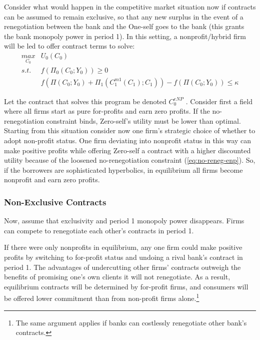 \documentclass[11pt,english]{article}
\theoremstyle{plain}
\theoremstyle{definition}
\begin{document}
Consider what would happen in the competitive market situation now
if contracts can be assumed to remain exclusive, so that any new surplus
in the event of a renegotiation between the bank and the One-self
goes to the bank (this grants the bank monopoly power in period 1).
In this setting, a nonprofit/hybrid firm will be led to offer contract
terms to solve:
\begin{align}
\underset{C_{0}}{max} & U_{0}\left(C_{0}\right)\\
s.t. & f\left(\Pi_{0}(C_{0};Y_{0})\right)\geq0\\
 & f\left(\Pi\left(C_{0};Y_{0}\right)+\Pi_{1}\left(C_{1}^{m1}\left(C_{1}\right);C_{1}\right)\right)-f\left(\Pi\left(C_{0};Y_{0}\right)\right)\leq\kappa\label{eq:no-reneg-enp}
\end{align}

Let the contract that solves this program be denoted $C_{0}^{eNP}$
. Consider first a field where all firms start as pure for-profits
and earn zero profits. If the no-renegotiation constraint binds, Zero-self's
utility must be lower than optimal. Starting from this situation consider
now one firm's strategic choice of whether to adopt non-profit status.
One firm deviating into nonprofit status in this way can make positive
profits while offering Zero-self a contract with a higher discounted
utility because of the loosened no-renegotiation constraint (\ref{eq:no-reneg-enp}).
So, if the borrowers are sophisticated hyperbolics, in equilibrium
all firms become nonprofit and earn zero profits.

\subsubsection{Non-Exclusive Contracts}

Now, assume that exclusivity and period 1 monopoly power disappears.
Firms can compete to renegotiate each other's contracts in period
1.

If there were only nonprofits in equilibrium, any one firm could make
positive profits by switching to for-profit status and undoing a rival
bank's contract in period 1. The advantages of undercutting other
firms' contracts outweigh the benefits of promising one's own clients
it will not renegotiate. As a result, equilibrium contracts will be
determined by for-profit firms, and consumers will be offered lower
commitment than from non-profit firms alone.\footnote{The same argument applies if banks can costlessly renegotiate other
bank's contracts.}  
\end{document}

